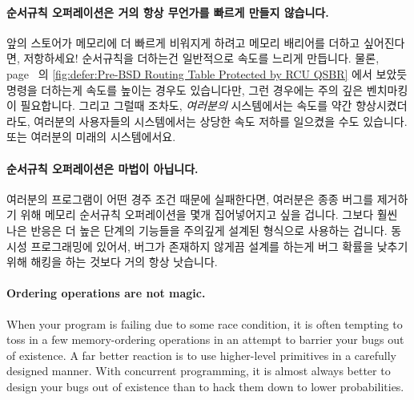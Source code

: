 \fi

\paragraph{순서규칙 오퍼레이션은 거의 항상 무언가를 빠르게 만들지 않습니다.}
앞의 스토어가 메모리에 더 빠르게 비워지게 하려고 메모리 배리어를 더하고
싶어진다면, 저항하세요!
순서규칙을 더하는건 일반적으로 속도를 느리게 만듭니다.
물론,
page~\pageref{fig:defer:Pre-BSD Routing Table Protected by RCU QSBR} 의
\cref{fig:defer:Pre-BSD Routing Table Protected by RCU QSBR} 에서 보았듯 명령을
더하는게 속도를 높이는 경우도 있습니다만, 그런 경우에는 주의 깊은 벤치마킹이
필요합니다.
그리고 그럴때 조차도, \emph{여러분의} 시스템에서는 속도를 약간 향상시켰더라도,
여러분의 사용자들의 시스템에서는 상당한 속도 저하를 일으켰을 수도 있습니다.
또는 여러분의 미래의 시스템에서요.

\paragraph{순서규칙 오퍼레이션은 마법이 아닙니다.}
여러분의 프로그램이 어떤 경주 조건 때문에 실패한다면, 여러분은 종종 버그를
제거하기 위해 메모리 순서규칙 오퍼레이션을 몇개 집어넣어지고 싶을 겁니다.
그보다 훨씬 나은 반응은 더 높은 단계의 기능들을 주의깊게 설계된 형식으로
사용하는 겁니다.
동시성 프로그래밍에 있어서, 버그가 존재하지 않게끔 설계를 하는게 버그 확률을
낮추기 위해 해킹을 하는 것보다 거의 항상 낫습니다.

\iffalse

\paragraph{Ordering operations are not magic.}
When your program is failing due to some race condition, it is often
tempting to toss in a few memory-ordering operations in an attempt
to barrier your bugs out of existence.
A far better reaction is to use higher-level primitives in a carefully
designed manner.
With concurrent programming, it is almost always better to design your
bugs out of existence than to hack them down to lower probabilities.

